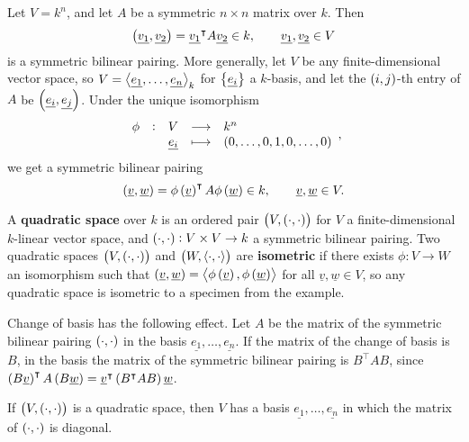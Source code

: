 \begin{example}
Let $ V = k^n $, and let $ A $ be a symmetric $ n \times n $ matrix over $ k $. Then
$$ \br{\underline{v_1}, \underline{v_2}} = \underline{v_1}^\intercal A\underline{v_2} \in k, \qquad \underline{v_1}, \underline{v_2} \in V $$
is a symmetric bilinear pairing. More generally, let $ V $ be any finite-dimensional vector space, so $ V = \left\langle \underline{e_1}, \dots, \underline{e_n} \right\rangle_k $ for $ \cbr{\underline{e_i}} $ a $ k $-basis, and let the $ \br{i, j} $-th entry of $ A $ be $ \br{\underline{e_i}, \underline{e_j}} $. Under the unique isomorphism
$$ \function[\phi]{V}{k^n}{\underline{e_i}}{\br{0, \dots, 0, 1, 0, \dots, 0}}, $$
we get a symmetric bilinear pairing
$$ \br{\underline{v}, \underline{w}} = \phi\br{\underline{v}}^\intercal A\phi\br{\underline{w}} \in k, \qquad \underline{v}, \underline{w} \in V. $$
\end{example}

\begin{definition}
A \textbf{quadratic space} over $ k $ is an ordered pair $ \br{V, \br{\cdot, \cdot}} $ for $ V $ a finite-dimensional $ k $-linear vector space, and $ \br{\cdot, \cdot} : V \times V \to k $ a symmetric bilinear pairing. Two quadratic spaces $ \br{V, \br{\cdot, \cdot}} $ and $ \br{W, \abr{\cdot, \cdot}} $ are \textbf{isometric} if there exists $ \phi : V \to W $ an isomorphism such that $ \br{\underline{v}, \underline{w}} = \abr{\phi\br{\underline{v}}, \phi\br{\underline{w}}} $ for all $ \underline{v}, \underline{w} \in V $, so any quadratic space is isometric to a specimen from the example.
\end{definition}

\begin{remark}
Change of basis has the following effect. Let $ A $ be the matrix of the symmetric bilinear pairing $ \br{\cdot, \cdot} $ in the basis $ \underline{e_1}, \dots, \underline{e_n} $. If the matrix of the change of basis is $ B $, in the basis the matrix of the symmetric bilinear pairing is $ B^\intercal AB $, since $ \br{B\underline{v}}^\intercal A\br{B\underline{w}} = \underline{v}^\intercal \br{B^\intercal AB}\underline{w} $.
\end{remark}

\begin{theorem}
If $ \br{V, \br{\cdot, \cdot}} $ is a quadratic space, then $ V $ has a basis $ \underline{e_1}, \dots, \underline{e_n} $ in which the matrix of $ \br{\cdot, \cdot} $ is diagonal.
\end{theorem}

